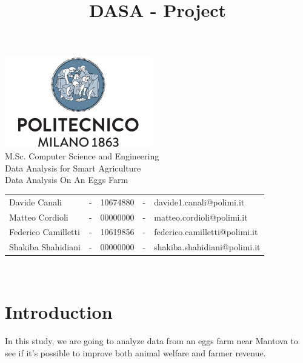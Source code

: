 \documentclass[11pt]{article}
\title{DASA - Project}
\begin{document}
\setlength{\parskip}{1em}

\begin{titlepage}
\centering
\vfill
{
\includegraphics[width =\linewidth, height = 4cm, keepaspectratio]{PolitecnicoLogo.png}
\label{fig:PolitecnicoLogo}
\large \\[2ex]M.Sc. Computer Science and Engineering\\
\large Data Analysis for Smart Agriculture\\[12ex]
\huge
Data Analysis On An Eggs Farm\\[1.5ex]
\large
\vspace{10mm}

\vspace{15mm}
\normalsize

\vspace{30mm}

\begin{tabular}{lclcl}
    Davide Canali & - & 10674880 & - & davide1.canali@polimi.it\\
    Matteo Cordioli & - & 00000000 & - & matteo.cordioli@polimi.it\\
    Federico Camilletti & - & 10619856 & - & federico.camilletti@polimi.it\\
    Shakiba Shahidiani  & - & 00000000 & - & shakiba.shahidiani@polimi.it\\
\end{tabular}

\vspace{30mm}

\@date\\[2.5ex]
}
\end{titlepage}

\makeatother
\tableofcontents
\newpage

\section{Introduction}
In this study, we are going to analyze data from an eggs farm near Mantova to see if it's possible to improve both animal welfare and farmer revenue.
\end{document}
